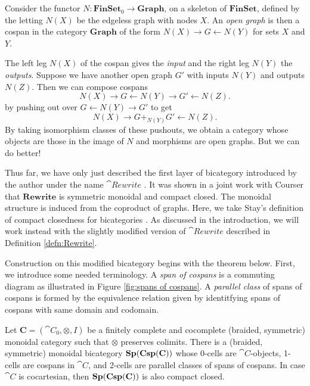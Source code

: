 \documentclass[./1--Catfying_zxCalc--Master.tex]{subfiles} %
\begin{document}
\begin{defn}
	\label{def:Open Graph}
	Consider the functor 
		$N \colon \mathbf{FinSet}_0 \to \mathbf{Graph}$, 
	on a skeleton of $\mathbf{FinSet}$, 
	defined by the letting 
	$N(X)$ be the edgeless graph 
	with nodes $X$.  
	An \emph{open graph} is then 
	a cospan in the category 
		$\mathbf{Graph}$ 
	of the form 
		$N(X) \to G \gets N(Y)$ 
	for sets $X$ and $Y$.
\end{defn}

The left leg $N(X)$ of the cospan 
gives the \emph{input} and 
the right leg $N(Y)$ the \emph{outputs}.  
Suppose we have another open graph $G'$ 
with inputs $N(Y)$ and outputs $N(Z)$.  
Then we can compose cospans 
\[
	N(X) \to G \gets N(Y) \to G' \gets N(Z). 
\] 
by pushing out over 
$G \gets N(Y) \to G'$ to get 
\[
	N(X) \to G +_{ N ( Y ) } G' \gets N(Z).
\] 
By taking isomorphism classes 
of these pushouts, 
we obtain a category whose 
objects are those in the image of $N$ 
and morphisms are open graphs. 
But we can do better! 

Thus far, we have only 
just described the first layer 
of bicategory
introduced by the author 
under the name $\cat{Rewrite}$
\cite{Cicala_SpansCospans}.
It was shown in a joint work with Courser
\cite{CicalaCourser_BicatSpansCospan} 
that $\mathbf{Rewrite}$ is 
symmetric monoidal and compact closed. 
The monoidal structure is 
induced from the coproduct of graphs.  
Here, we take Stay's definition 
of compact closedness for bicategories
\cite{Stay_CompactClosedBicats}. 
As discussed in the introduction, 
we will work instead with
the slightly modified version of $\cat{Rewrite}$
described in Definition \ref{defn:Rewrite}.

Construction on this modified bicategory
begins with the theorem below.
First, we introduce some needed terminology.
A \emph{span of cospans} is 
a commuting diagram as illustrated 
in Figure \ref{fig:spans of cospans}.  
A \emph{parallel class} of spans of cospans is
formed by the equivalence relation 
given by identitfying
spans of cospans
with same domain and codomain.

\begin{thm}
	\label{thm:SpCspC is SMCC bicategory}
	Let $\mathbf{C} = (\cat{C}_0,\otimes,I)$ 
	be a finitely complete and cocomplete
	(braided, symmetric) monoidal category 
	such that $\otimes$ preserves colimits.   
	There is a 
	(braided, symmetric) monoidal bicategory 
	$ \mathbf{Sp(Csp(C))} $ 
	whose 
	0-cells are $\cat{C}$-objects, 
	1-cells are cospans in $\cat{C}$, and 
	2-cells are	parallel classes 
	of spans of cospans.
	In case $\cat{C}$ is cocartesian, 
	then $\mathbf{Sp(Csp(C))}$ is also compact closed.
\end{thm}
\end{document}
